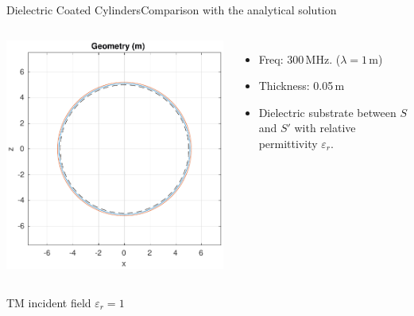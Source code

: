  \begin{frame}[allowframebreaks]{Dielectric Coated Cylinders}{Comparison with the analytical solution }

    
    \begin{columns}
      \includegraphics[width=\linewidth]{results/TMc4/geometry.pdf}
      
      \begin{itemize}
      \item
        Freq: 300\,MHz. ($\lambda=1\,$m)
      \item
        Thickness: 0.05\,m
      \item
        Dielectric substrate between $S$ and $S'$ with relative permittivity 
        $\varepsilon_r$.
      \end{itemize}
    \end{columns}

    \framebreak
        
    \hfill TM incident field $\varepsilon_r=1$ \hfill\mbox{}


\end{frame}
